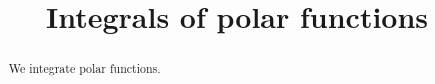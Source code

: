 \documentclass{ximera}
\title[Dig-In:]{Integrals of polar functions}
\begin{document}
\begin{abstract}
  We integrate polar functions.
\end{abstract}
\maketitle





\end{document}
